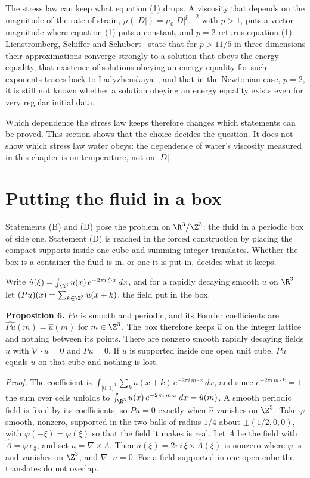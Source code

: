 The stress law can keep what equation (1) drops. A viscosity that depends on the magnitude of the
rate of strain, $\mu(|D|) = \mu_0|D|^{p-2}$ with $p > 1$, puts a vector magnitude where equation (1)
puts a constant, and $p = 2$ returns equation (1). Lienstromberg, Schiffer and Schubert~\cite{src:Lienstromberg-Schiffer-Schubert-2025} state that
for $p > 11/5$ in three dimensions their approximations converge strongly to a solution that obeys
the energy equality, that existence of solutions obeying an energy equality for such exponents
traces back to Ladyzhenskaya~\cite{src:Ladyzhenskaya-1967,src:Ladyzhenskaya-1968,src:Ladyzhenskaya-1969},
and that in the Newtonian case, $p = 2$, it is still not known whether a solution obeying an energy
equality exists even for very regular initial data.

Which dependence the stress law keeps therefore changes which statements can be proved. This
section shows that the choice decides the question. It does not show which stress law water obeys:
the dependence of water's viscosity measured in this chapter is on temperature, not on $|D|$.

\section{Putting the fluid in a box}

Statements (B) and (D) pose the problem on $\R^3/\Z^3$: the fluid in a periodic box of side one.
Statement (D) is reached in the forced construction by placing the compact supports inside one
cube and summing integer translates. Whether the box is a container the fluid is in, or one it is
put in, decides what it keeps.

Write $\hat u(\xi) = \int_{\R^3} u(x)\,e^{-2\pi i\,\xi\cdot x}\,dx$, and for a rapidly decaying smooth
$u$ on $\R^3$ let $(Pu)(x) = \sum_{k\in\Z^3} u(x+k)$, the field put in the box.

\textbf{Proposition 6.} $Pu$ is smooth and periodic, and its Fourier coefficients are
$\widehat{Pu}(m) = \hat u(m)$ for $m\in\Z^3$. The box therefore keeps $\hat u$ on the integer
lattice and nothing between its points. There are nonzero smooth rapidly decaying fields $u$ with
$\nabla\cdot u = 0$ and $Pu = 0$. If $u$ is supported inside one open unit cube, $Pu$ equals $u$
on that cube and nothing is lost.

\emph{Proof.} The coefficient is $\int_{[0,1)^3}\sum_k u(x+k)\,e^{-2\pi i\,m\cdot x}\,dx$, and since
$e^{-2\pi i\,m\cdot k} = 1$ the sum over cells unfolds to $\int_{\R^3} u(x)\,e^{-2\pi i\,m\cdot x}\,dx
= \hat u(m)$. A smooth periodic field is fixed by its coefficients, so $Pu = 0$ exactly when $\hat u$
vanishes on $\Z^3$. Take $\varphi$ smooth, nonzero, supported in the two balls of radius $1/4$
about $\pm(1/2,0,0)$, with $\varphi(-\xi) = \overline{\varphi(\xi)}$ so that the field it makes is
real. Let $A$ be the field with $\hat A = \varphi\,e_3$, and set $u = \nabla\times A$. Then
$\hat u(\xi) = 2\pi i\,\xi\times\hat A(\xi)$ is nonzero where $\varphi$ is and vanishes on $\Z^3$, and
$\nabla\cdot u = 0$. For a field supported in one open cube the translates do not overlap.
\hfill\qedsymbol

